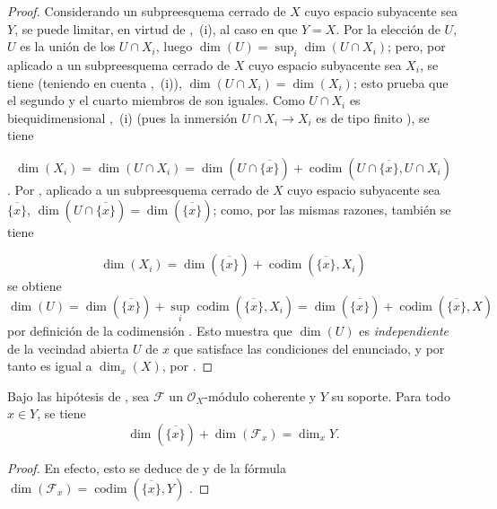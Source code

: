 \begin{proof}
Considerando un subpreesquema cerrado de $X$ cuyo espacio subyacente sea $Y$, se puede limitar, en virtud de ,~(i), al caso en que $Y=X$.
Por la elección de $U$, $U$ es la unión de los $U\cap X_i$, luego $\dim(U)=\sup_i\dim(U\cap X_i)$; pero, por  aplicado a un subpreesquema cerrado de $X$ cuyo espacio subyacente sea $X_i$, se tiene (teniendo en cuenta ,~(i)), $\dim(U\cap X_i)=\dim(X_i)$; esto prueba que el segundo y el cuarto miembros de  son iguales.
Como $U\cap X_i$ es biequidimensional ,~(i) (pues la inmersión $U\cap X_i\to X_i$ es de tipo finito ), se tiene

\begin{equation}
\label{IV.10.6.3.2-fr}
\tag{10.6.3.2}
\dim(X_i)=\dim(U\cap X_i)=\dim(U\cap\overline{\{x\}})
 +\operatorname{codim}(U\cap\overline{\{x\}},U\cap X_i)
\end{equation}
.
Por , aplicado a un subpreesquema cerrado de $X$ cuyo espacio subyacente sea $\overline{\{x\}}$, $\dim(U\cap\overline{\{x\}})=\dim(\overline{\{x\}})$; como, por las mismas razones, también se tiene

\begin{equation}
\label{IV.10.6.3.3-fr}
\tag{10.6.3.3}
\dim(X_i)=\dim(\overline{\{x\}})
 +\operatorname{codim}(\overline{\{x\}},X_i)
\end{equation}
se obtiene
\[
  \dim(U)=\dim(\overline{\{x\}})
  +\sup_i\operatorname{codim}(\overline{\{x\}},X_i)
  =\dim(\overline{\{x\}})+\operatorname{codim}(\overline{\{x\}},X)
\]
por definición de la codimensión .
Esto muestra que $\dim(U)$ es \emph{independiente} de la vecindad abierta $U$ de $x$ que satisface las condiciones del enunciado, y por tanto es igual a $\dim_x(X)$, por .
\end{proof}

\begin{corollary}[10.6.4]
\label{IV.10.6.4}
Bajo las hipótesis de , sea $\mathcal F$ un $\mathcal O_X$-módulo coherente y $Y$ su soporte.
Para todo $x\in Y$, se tiene
\begin{equation}
\label{IV.10.6.4.1-fr}
\tag{10.6.4.1}
\dim(\overline{\{x\}})+\dim(\mathcal F_x)=\dim_xY.
\end{equation}
\end{corollary}

\begin{proof}
En efecto, esto se deduce de  y de la fórmula $\dim(\mathcal F_x)=\operatorname{codim}(\overline{\{x\}},Y)$ .
\end{proof}

